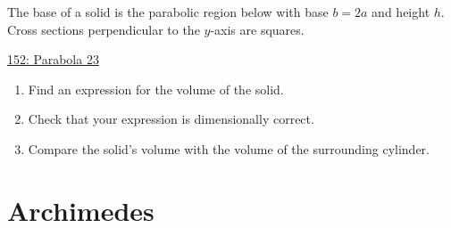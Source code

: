 \documentclass{ximera}
\begin{document}
\begin{question} \label{QLkdfmmdf}
The base of a solid is the parabolic region below with base $b=2a$ and height $h$. Cross sections perpendicular to the $y$-axis are squares.



\begin{onlineOnly}
    \begin{center}
\end{center}
\end{onlineOnly}

\href{ https://www.desmos.com/calculator/mbxrsmdho8}{152: Parabola 23}
\begin{enumerate}

\item Find an expression for the volume of the solid. 

\item Check that your expression is dimensionally correct.

\item Compare the solid's volume with the volume of the surrounding cylinder.


\end{enumerate}
\end{question}

\section{Archimedes}
\end{document}

